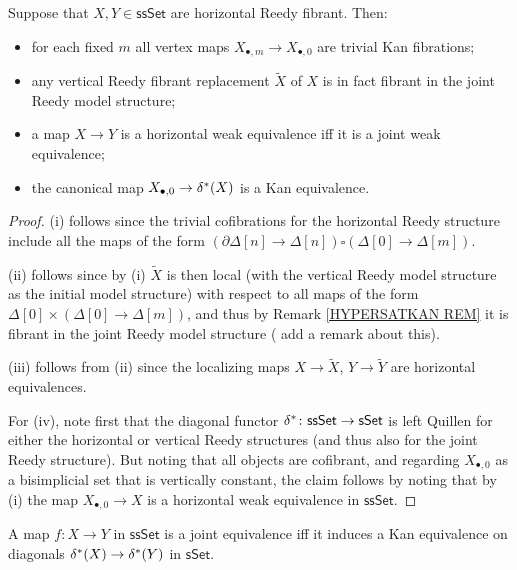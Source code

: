 \documentclass[a4paper,10pt,draft]{article}%
\begin{document}
\begin{proposition}\label{SSSETJREE PROP}
	Suppose that $X, Y \in \mathsf{ssSet}$ are horizontal Reedy fibrant. Then:
\begin{itemize}
	\item[(i)] for each fixed $m$ all vertex maps $X_{\bullet,m} \to X_{\bullet,0}$ are trivial Kan fibrations;
	\item[(ii)] any vertical Reedy fibrant replacement $\tilde{X}$ of $X$ is in fact fibrant in the joint Reedy model structure;
	\item[(iii)] a map $X \to Y$ is a horizontal weak equivalence iff it is a joint weak equivalence;
	\item[(iv)] the canonical map $X_{\bullet,0} \to \delta^{\**}(X)$ is a Kan equivalence. %
\end{itemize}
\end{proposition}

\begin{proof}
(i) follows since the trivial cofibrations for the horizontal Reedy structure include all the maps of the form
$(\partial \Delta[n] \to \Delta[n]) \square (\Delta[0] \to \Delta[m])$.

(ii) follows since by (i) $\tilde{X}$ is then local
(with the vertical Reedy model structure as the initial model structure)
with respect to all maps of the form
$\Delta[0] \times (\Delta[0] \to \Delta[m])$,
and thus by Remark \ref{HYPERSATKAN REM}
it is fibrant in the joint Reedy model structure ({\color{blue} add a remark about this}).

(iii) follows from (ii) since the localizing maps 
$X \to \tilde{X}$, $Y \to \tilde{Y}$
are horizontal equivalences.

For (iv), note first that the diagonal functor
$\delta^{\**} \colon \mathsf{ssSet} \to \mathsf{sSet}$
is left Quillen for either the horizontal or vertical Reedy structures (and thus also for the joint Reedy structure). But noting that all objects are cofibrant, and regarding %
$X_{\bullet,0}$ as a bisimplicial set that is vertically constant, the claim
follows by noting that by (i) the map
$X_{\bullet, 0} \to X$ is a horizontal weak equivalence in $\mathsf{ssSet}$.
\end{proof}

\begin{corollary}\label{WEAKDIAG COR}
	A map $f\colon X \to Y$ in $\mathsf{ssSet}$ is a joint equivalence iff it induces a Kan equivalence on diagonals
	$\delta^{\**}(X) \to \delta^{\**}(Y)$ in $\mathsf{sSet}$.
\end{corollary}
\end{document}
